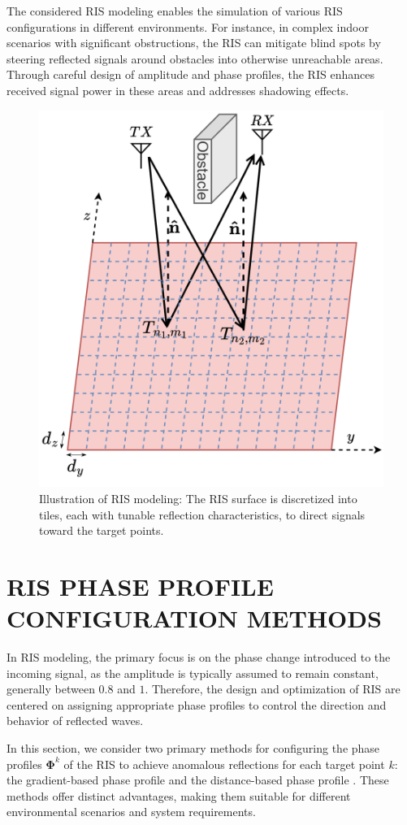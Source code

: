 \documentclass{IEEEoj}
\begin{document}
The considered RIS modeling enables the simulation of various RIS configurations in different environments. For instance, in complex indoor scenarios with significant obstructions, the RIS can mitigate blind spots by steering reflected signals around obstacles into otherwise unreachable areas. Through careful design of amplitude and phase profiles, the RIS enhances received signal power in these areas and addresses shadowing effects.

\begin{figure}
	\centering \includegraphics[width=.8\linewidth]{RIS_Modeling.png}
	\caption{Illustration of RIS modeling: The RIS surface is discretized into tiles, each with tunable reflection characteristics, to direct signals toward the target points.}
	\label{RIS_Modeling}
\end{figure}

\section{RIS PHASE PROFILE CONFIGURATION METHODS} \label{sec:phase_profile_section}
In RIS modeling, the primary focus is on the phase change introduced to the incoming signal, as the amplitude is typically assumed to remain constant, generally between $0.8$ and $1$. Therefore, the design and optimization of RIS are centered on assigning appropriate phase profiles to control the direction and behavior of reflected waves.

In this section, we consider two primary methods for configuring the phase profiles $\mathbf{\Phi}^k$ of the RIS to achieve anomalous reflections for each target point $k$: the gradient-based phase profile \cite{phase_grad_paper} and the distance-based phase profile \cite{Tang}. These methods offer distinct advantages, making them suitable for different environmental scenarios and system requirements.
\end{document}
